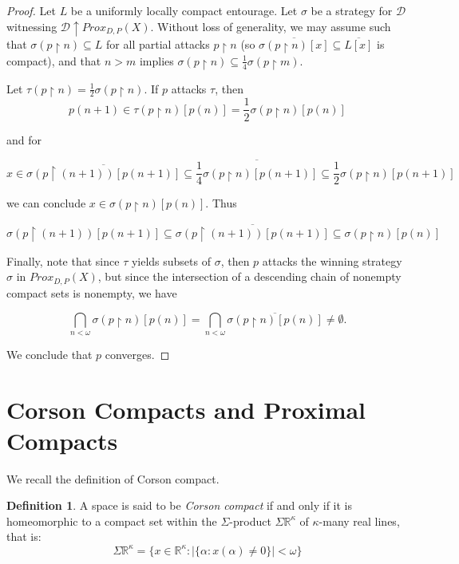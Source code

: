\documentclass{amsart}
\theoremstyle{definition}
\newtheorem{defn}[thm]{Definition}
\theoremstyle{remark}
\newcommand{\<}{\langle}
\renewcommand{\>}{\rangle}
\newcommand{\cl}[1]{\overline{#1}}
\newcommand{\proxgame}[1]{Prox_{D,P}(#1)}
\newcommand{\pl}[1]{\mathscr{#1}}
\newcommand{\win}{\uparrow}
\newcommand{\rest}{\restriction}
\newcommand{\term}{\textit}
\begin{document}
\begin{proof}
  Let $L$ be a uniformly locally compact entourage. Let $\sigma$ be a strategy for $\pl D$ witnessing $\pl D\win \proxgame{X}$. Without loss of generality, we may assume such that $\sigma(p\rest n)\subseteq L$ for all partial attacks $p\rest n$ (so $\cl{\sigma(p\rest n)[x]}\subseteq\cl{L[x]}$ is compact), and that $n > m$ implies $\sigma(p\rest n)\subseteq \frac{1}{4}\sigma(p\rest m)$.

  Let $\tau(p\rest n)=\frac{1}{2}\sigma(p\rest n)$. If $p$ attacks $\tau$, then
    \[
      p(n+1)
        \in
      \tau(p\rest n)[p(n)]
        =
      \frac{1}{2}\sigma(p\rest n)[p(n)]
    \]

    and for

    \[
      x
        \in
      \cl{\sigma(p\rest (n+1))[p(n+1)]}
        \subseteq
      \cl{\frac{1}{4}\sigma(p\rest n)[p(n+1)]}
        \subseteq
      \frac{1}{2}\sigma(p\rest n)[p(n+1)]
    \]

  we can conclude $x\in\sigma(p\rest n)[p(n)]$. Thus

    \[
      \sigma(p\rest (n+1))[p(n+1)]
        \subseteq
      \cl{\sigma(p\rest (n+1))[p(n+1)]}
        \subseteq
      \sigma(p\rest n)[p(n)]
    \]

  Finally, note that since $\tau$ yields subsets of $\sigma$, then $p$ attacks the winning strategy $\sigma$ in $\proxgame{X}$, but since the intersection of a descending chain of nonempty compact sets is nonempty, we have

    \[
      \bigcap_{n<\omega} \sigma(p\rest n)[p(n)]
        =
      \bigcap_{n<\omega} \cl{\sigma(p\rest n)[p(n)]}
        \not=
      \emptyset.
    \]

  We conclude that $p$ converges.
\end{proof}


\section{Corson Compacts and Proximal Compacts}

We recall  the definition of Corson compact.

\begin{defn}
  A space is said to be \term{Corson compact} if and only if it is homeomorphic to a compact set within the $\Sigma$-product $\Sigma\mathbb{R}^\kappa$ of $\kappa$-many real lines, that is:
    \[
      \Sigma\mathbb{R}^\kappa
        =
      \{x\in \mathbb{R}^\kappa: |\{\alpha:x(\alpha)\not=0\}|<\omega\}
    \]
\end{defn}
\end{document}
